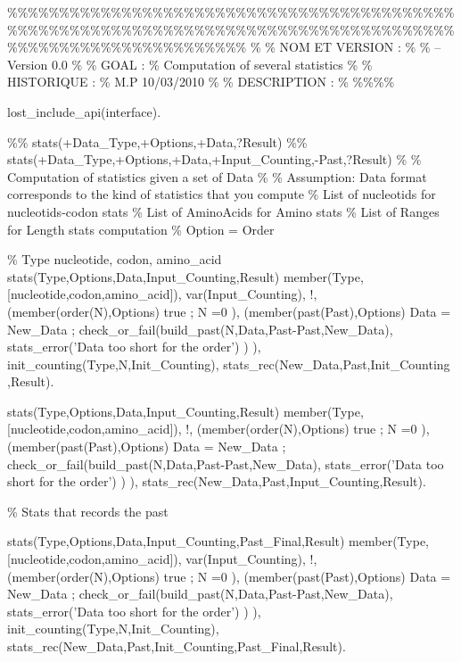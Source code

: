 


\%\%\%\%\%\%\%\%\%\%\%\%\%\%\%\%\%\%\%\%\%\%\%\%\%\%\%\%\%\%\%\%\%\%\%\%\%\%\%\%\%\%\%\%\%\%\%\%\%\%\%\%\%\%\%\%\%\%\%\%\%\%\%\%\%\%\%\%\%\%\%\%\%\%\%\%\%\%\%\%\%\%\%\%\%\%\%\%\%\%\%\%\%\%\%\%\%\%\%\%\%\%\%\%\%\%\%\%\%
\%
\% NOM ET VERSION :
\%
\%  -- Version 0.0
\%
\% GOAL :
\% Computation of several statistics
\%
\% HISTORIQUE :
\% M.P 10/03/2010
\%
\% DESCRIPTION :
\%
\%\%\%\%

\Sneck{} lost_include_api(interface).

\%\% stats(+Data_Type,+Options,+Data,?Result)
\%\% stats(+Data_Type,+Options,+Data,+Input_Counting,-Past,?Result)
\%
\% Computation of statistics given a set of Data
\%
\% Assumption: Data format corresponds to the kind of statistics that you compute
\% List of nucleotids for nucleotids-codon stats
\% List of AminoAcids for Amino stats
\% List of Ranges for Length stats computation
\% Option = Order

\begin{center}
\% Type nucleotide, codon, amino_acid
stats(Type,Options,Data,Input_Counting,Result) \Sneck{}
member(Type,[nucleotide,codon,amino_acid]),
var(Input_Counting),
!,
(member(order(N),Options) \Sifthen{}
true
;
N =0
),
(member(past(Past),Options) \Sifthen{}
Data = New_Data
;
check_or_fail(build_past(N,Data,Past-Past,New_Data),
stats_error('Data too short for the order')
)
),
init_counting(Type,N,Init_Counting),
stats_rec(New_Data,Past,Init_Counting ,Result).
\end{center}

\begin{center}
stats(Type,Options,Data,Input_Counting,Result) \Sneck{}
member(Type,[nucleotide,codon,amino_acid]),
!,
(member(order(N),Options) \Sifthen{}
true
;
N =0
),
(member(past(Past),Options) \Sifthen{}
Data = New_Data
;
check_or_fail(build_past(N,Data,Past-Past,New_Data),
stats_error('Data too short for the order')
)
),
stats_rec(New_Data,Past,Input_Counting,Result).
\end{center}

\% Stats that records the past

\begin{center}
stats(Type,Options,Data,Input_Counting,Past_Final,Result) \Sneck{}
member(Type,[nucleotide,codon,amino_acid]),
var(Input_Counting),
!,
(member(order(N),Options) \Sifthen{}
true
;
N =0
),
(member(past(Past),Options) \Sifthen{}
Data = New_Data
;
check_or_fail(build_past(N,Data,Past-Past,New_Data),
stats_error('Data too short for the order')
)
),
init_counting(Type,N,Init_Counting),
stats_rec(New_Data,Past,Init_Counting,Past_Final,Result).
\end{center}

